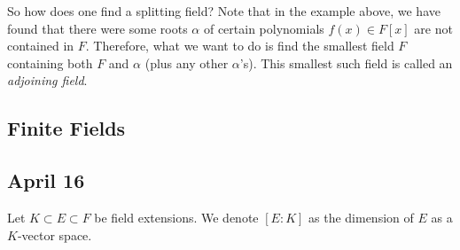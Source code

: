   So how does one find a splitting field? Note that in the example above, we have found that there were some roots $\alpha$ of certain polynomials $f(x) \in F[x]$ are not contained in $F$. Therefore, what we want to do is find the smallest field $F$ containing both $F$ and $\alpha$ (plus any other $\alpha$'s). This smallest such field is called an \textit{adjoining field}. 

\subsection{Finite Fields}

\subsection{April 16} 

  Let $K \subset E \subset F$ be field extensions. We denote $[E:K]$ as the dimension of $E$ as a $K$-vector space. 


